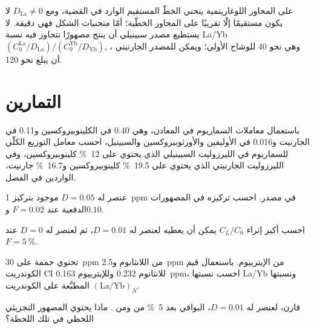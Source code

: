 على المحاور اللوغاريتمية ينحني الخطّ المستقيم الوارد في القضية، ومع
$D_{\mathrm{La}} \ne 0$ لا يكون مستقيمًا إلّا تقريبًا على المحاور الخطّية؛ أمّا منحنيات
الشكل فهي دقيقة. لا يستطيع مصدر سبينيلي أن ينتج مصهورًا تتجاوز فيه نسبة La/Yb
$(C_0^{\mathrm{La}}/D_{\mathrm{La}})/(C_0^{\mathrm{Yb}}/D_{\mathrm{Yb}})$,
، وهي نحو 40 للوشاح الأولي؛ ويمكن للمصدر الجارنيتي أن يبلغ نحو 120.

\section{التمارين}

\begin{exercise}[$\star$]\label{exo:b3:trace-element-modelling:1}
باستعمال معاملات السماريوم في المعادن، وهي 0.40 في الكلينوبيروكسين و0.11 في
الجارنيت و0.016 في الأوليفين والأورثوبيروكسين والسبينيل، احسب معامل التوزيع الكلّي للسماريوم
في الليرزوليت السبينيلي الذي يحتوي على \qty{12}{\percent} كلينوبيروكسين،
وفي الليرزوليت الجارنيتي الذي يحتوي على \qty{19.5}{\percent} كلينوبيروكسين
و\qty{16.7}{\percent} جارنيت، الواردين في الفصل.
\end{exercise}

\begin{exercise}[$\star$]\label{exo:b3:trace-element-modelling:2}
عنصر له $D = 0.05$ موجود بتركيز \qty{1}{ppm} في مصدر. احسب
تركيزه في المصهورات الدفعية عند $F = 0.02$ و$0.10$.
\end{exercise}

\begin{exercise}[$\star$]\label{exo:b3:trace-element-modelling:3}
احسب أكبر إثراء $C_L/C_0$ يمكن أن يعطيه  لعنصر
له $D = 0.01$، ثم لعنصر له $D = 0$ عند
$F = \qty{5}{\percent}$.
\end{exercise}

\begin{exercise}[$\star$]\label{exo:b3:trace-element-modelling:4}
تحتوي حممة على \qty{30}{ppm} من اللانثانوم و\qty{2.5}{ppm} من الإيتربيوم. باستعمال قيم الكوندريت CI
للانثانوم 0.232 وللإيتربيوم \qty{0.163}{ppm}، احسب نسبتها La/Yb
ونسبتها المطبَّعة على الكوندريت $(\mathrm{La}/\mathrm{Yb})_N$.
\end{exercise}

\begin{exercise}[$\star\star$]\label{exo:b3:trace-element-modelling:5}
قارن، لعنصر له $D = 0.01$، البواقي بعد \qty{5}{\percent}
من  ومن . ماذا يحتوي المصهور
التجزيئي اللحظي في تلك اللحظة؟
\end{exercise}

